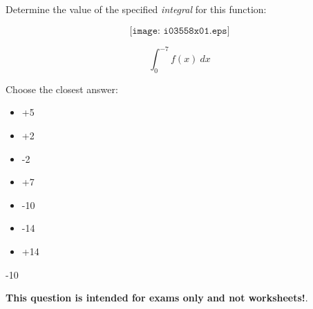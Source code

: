 

Determine the value of the specified {\it integral} for this function:

$$\texttt{[image: i03558x01.eps]}$$

$$\int_{0}^{-7} f(x) \> dx$$

Choose the closest answer:

\begin{itemize}
\item{} +5
\vskip 10pt 
\item{} +2
\vskip 10pt 
\item{} -2
\vskip 10pt 
\item{} +7
\vskip 10pt 
\item{} -10
\vskip 10pt 
\item{} -14
\vskip 10pt 
\item{} +14
\end{itemize}







-10






{\bf This question is intended for exams only and not worksheets!}.



